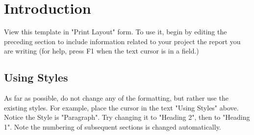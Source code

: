 \documentclass[acmsmall,nonacm]{acmart}
\begin{document}



\maketitle
\thispagestyle{headings}

\section{Introduction}
View this template in "Print Layout" form. To use it, begin by editing the preceding section to include information related 
to your project the report you are writing (for help, press F1 when the text cursor is in a field.) 

\subsection*{Using Styles}

As far as possible, do not change any of the formatting, but rather use the existing styles. For example, place the cursor 
in the text "Using Styles" above. Notice the Style is "Paragraph". Try changing it to "Heading 2", then to "Heading 1". 
Note the numbering of subsequent sections is changed automatically.
\end{document}
